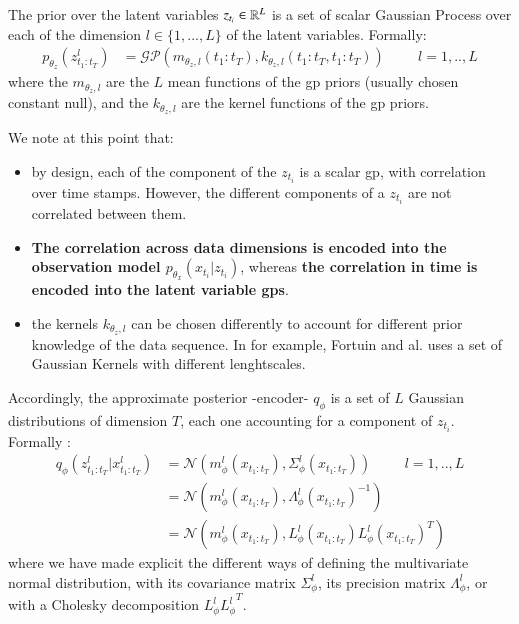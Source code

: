 The prior over the latent variables $z_{t_i} \in \mathbb{R}^L$ is a set of scalar Gaussian Process over each of the dimension $l \in \{1,...,L\}$ of the latent variables. Formally:
\begin{align}
    p_{\theta_z}(z_{t_1:t_T}^l) &= \mathcal{GP}(m_{\theta_z, l}(t_1:t_T), k_{\theta_z, l}(t_1:t_T, t_1:t_T)) \hspace{1cm} l=1,..,L
\end{align}
where the $m_{\theta_z, l}$ are the $L$ mean functions of the \gls{gp} priors (usually chosen constant null), and the $k_{\theta_z, l}$ are the kernel functions of the \gls{gp} priors.

We note at this point that:
\begin{itemize}
    \item by design, each of the component of the $z_{t_i}$ is a scalar \gls{gp}, with correlation over time stamps. However, the different components of a $z_{t_i}$ are not correlated between them. 
    \item \textbf{The correlation across data dimensions is encoded into the observation model $p_{\theta_x}(x_{t_i} \vert z_{t_i})$}, whereas \textbf{the correlation in time is encoded into the 
    latent variable \glspl{gp}}.
    \item the kernels $k_{\theta_z, l}$ can be chosen differently to account for different prior knowledge of the data sequence. In \cite{fortuin_gp-vae:_2020} for example, Fortuin and al. uses a set of Gaussian Kernels with different lenghtscales.
\end{itemize}

Accordingly, the approximate posterior -encoder- $q_\phi$ is a set of $L$ Gaussian distributions of dimension $T$, each one accounting for a component of $z_{t_i}$. Formally :
\begin{align}
    q_\phi(z_{t_1:t_T}^l \vert x_{t_1:t_T}^l) &= \mathcal{N}(m_{\phi}^l(x_{t_1:t_T}), \Sigma_{\phi}^l(x_{t_1:t_T})) \hspace{1cm} l=1,..,L \\
    &= \mathcal{N}(m_{\phi}^l(x_{t_1:t_T}), \Lambda_{\phi}^l(x_{t_1:t_T})^{-1}) \\
    &= \mathcal{N}(m_{\phi}^l(x_{t_1:t_T}), L_{\phi}^l(x_{t_1:t_T})L_{\phi}^l(x_{t_1:t_T})^T)
\end{align}
where we have made explicit the different ways of defining the multivariate normal distribution, with its covariance matrix $\Sigma_\phi^l$, 
its precision matrix $\Lambda_\phi^l$, or with a Cholesky decomposition $L_{\phi}^l{L_{\phi}^l}^T$.

